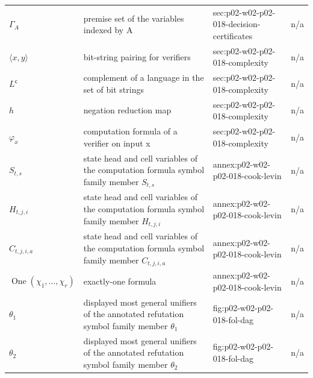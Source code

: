 \begin{longtable}{@{}p{}p{}p{}p{}@{}}
\(\Gamma_A\) & premise set of the variables indexed by A & sec:\allowbreak{}p02-\allowbreak{}w02-\allowbreak{}p02-\allowbreak{}018-\allowbreak{}decision-\allowbreak{}certificates & n/a \\
\(\langle x,\allowbreak y\rangle\) & bit-string pairing for verifiers & sec:\allowbreak{}p02-\allowbreak{}w02-\allowbreak{}p02-\allowbreak{}018-\allowbreak{}complexity & n/a \\
\(L^{\mathsf c}\) & complement of a language in the set of bit strings & sec:\allowbreak{}p02-\allowbreak{}w02-\allowbreak{}p02-\allowbreak{}018-\allowbreak{}complexity & n/a \\
\(h\) & negation reduction map & sec:\allowbreak{}p02-\allowbreak{}w02-\allowbreak{}p02-\allowbreak{}018-\allowbreak{}complexity & n/a \\
\(\varphi_x\) & computation formula of a verifier on input x & sec:\allowbreak{}p02-\allowbreak{}w02-\allowbreak{}p02-\allowbreak{}018-\allowbreak{}complexity & n/a \\
\(S_{t,s}\) & state head and cell variables of the computation formula symbol family member \(S_{t,s}\) & annex:\allowbreak{}p02-\allowbreak{}w02-\allowbreak{}p02-\allowbreak{}018-\allowbreak{}cook-\allowbreak{}levin & n/a \\
\(H_{t,j,i}\) & state head and cell variables of the computation formula symbol family member \(H_{t,j,i}\) & annex:\allowbreak{}p02-\allowbreak{}w02-\allowbreak{}p02-\allowbreak{}018-\allowbreak{}cook-\allowbreak{}levin & n/a \\
\(C_{t,j,i,a}\) & state head and cell variables of the computation formula symbol family member \(C_{t,j,i,a}\) & annex:\allowbreak{}p02-\allowbreak{}w02-\allowbreak{}p02-\allowbreak{}018-\allowbreak{}cook-\allowbreak{}levin & n/a \\
\(\operatorname{One}(\chi_1,\allowbreak \ldots,\allowbreak \chi_r)\) & exactly-one formula & annex:\allowbreak{}p02-\allowbreak{}w02-\allowbreak{}p02-\allowbreak{}018-\allowbreak{}cook-\allowbreak{}levin & n/a \\
\(\theta_1\) & displayed most general unifiers of the annotated refutation symbol family member \(\theta_1\) & fig:\allowbreak{}p02-\allowbreak{}w02-\allowbreak{}p02-\allowbreak{}018-\allowbreak{}fol-\allowbreak{}dag & n/a \\
\(\theta_2\) & displayed most general unifiers of the annotated refutation symbol family member \(\theta_2\) & fig:\allowbreak{}p02-\allowbreak{}w02-\allowbreak{}p02-\allowbreak{}018-\allowbreak{}fol-\allowbreak{}dag & n/a \\

\end{longtable}
